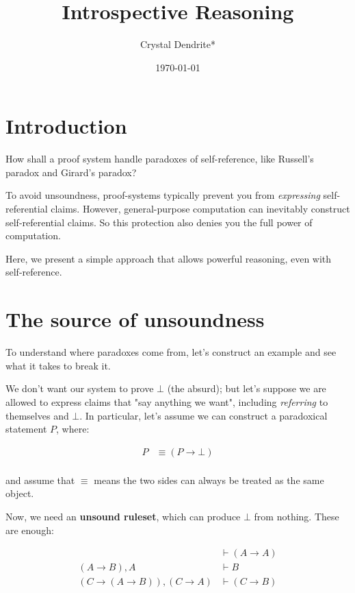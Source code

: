 \documentclass{article}
\title{Introspective Reasoning}
\author{Crystal Dendrite*}
\date{\today}
\begin{document}
  \maketitle
  
  \section{Introduction}
  
  How shall a proof system handle paradoxes of self-reference, like Russell's paradox and Girard's paradox?

  To avoid unsoundness, proof-systems typically prevent you from \emph{expressing} self-referential claims.
  However, general-purpose computation can inevitably construct self-referential claims.
  So this protection also denies you the full power of computation.

  Here, we present a simple approach that allows powerful reasoning, even with self-reference.

  \section{The source of unsoundness}

  To understand where paradoxes come from, let's construct an example and see what it takes to break it.

  We don't want our system to prove $\bot$ (the absurd); but let's suppose we are allowed to express claims that "say anything we want", including \emph{referring} to themselves and $\bot$. In particular, let's assume we can construct a paradoxical statement $P$, where:

  \begin{align*}
    P &\equiv (P \to \bot) \\
  \end{align*}

  and assume that $\equiv$ means the two sides can always be treated as the same object.

  Now, we need an \textbf{unsound ruleset}, which can produce $\bot$ from nothing. These are enough:

  \begin{align*}
    \label{refl}
    \tag{reflexivity}
    &\vdash (A \to A) \\
    \label{mp}
    \tag{modus ponens}
    (A \to B), A &\vdash B \\
    \label{unsoundrule}
    \tag{the trickster}
    (C \to (A \to B)), (C \to A) &\vdash (C \to B) \\
  \end{align*}
\end{document}
